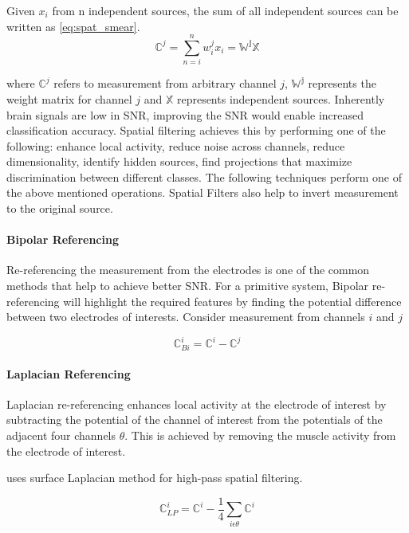 Given $x_{i}$ from n independent sources, the sum of all independent sources can be written as \ref{eq:spat_smear}.
\begin{equation} \label{eq:spat_smear}
    \mathbb{C}^{j} = \sum_{n = i}^{n} w_{i}^{j} x_{i} = \mathbb{W^{j} X} 
\end{equation}

where $\mathbb{C}^{j} $ refers to measurement from arbitrary channel $j$,  $\mathbb{W^j}$ represents the weight matrix for channel $j$ and $\mathbb{X}$ represents independent sources. Inherently brain signals are low in SNR, improving the SNR would enable increased classification accuracy. Spatial filtering achieves this by performing one of the following: enhance local activity, reduce noise across channels, reduce dimensionality, identify hidden sources, find projections that maximize discrimination between different classes. The following techniques perform one of the above mentioned operations. Spatial Filters also help to invert measurement to the original source.

\paragraph{Bipolar Referencing}
Re-referencing the measurement from the electrodes is one of the common methods that help to achieve better SNR.
For a primitive system, Bipolar re-referencing will highlight the required features by finding the potential difference between two electrodes of interests. Consider measurement from channels $i$ and $j$

\begin{equation} \label{eq:bip_eeg}
    \mathbb{C}^{i}_{Bi} =  \mathbb{C}^{i} - \mathbb{C}^{j}
\end{equation}

\paragraph{Laplacian Referencing}
Laplacian re-referencing enhances local activity at the electrode of interest by subtracting the potential of the channel of interest from the potentials of the adjacent four channels $\theta$. This is achieved by removing the muscle activity from the electrode of interest.

\cite{2005_MI_TF_ICA_DipAna} uses surface Laplacian method for high-pass spatial filtering.

\begin{equation} \label{eq:lap_eeg}
    \mathbb{C}^{i}_{LP} =  \mathbb{C}^{i} - \frac{1}{4} \sum_{i \epsilon \theta} \mathbb{C}^{i}
\end{equation}

